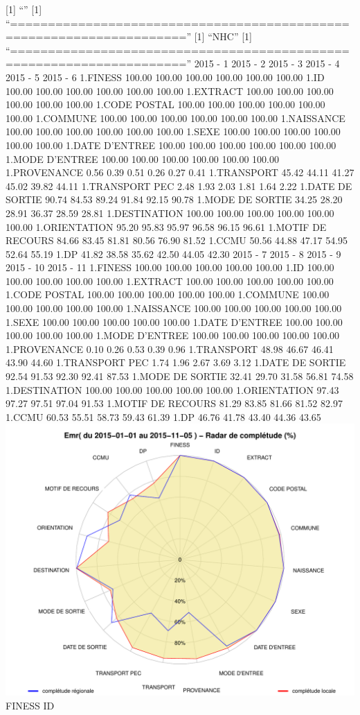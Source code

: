 \documentclass[]{article}
\begin{document}
{[}1{]} ``'' {[}1{]}
``=====================================================================''
{[}1{]} ``NHC'' {[}1{]}
``=====================================================================''
2015 - 1 2015 - 2 2015 - 3 2015 - 4 2015 - 5 2015 - 6 1.FINESS 100.00
100.00 100.00 100.00 100.00 100.00 1.ID 100.00 100.00 100.00 100.00
100.00 100.00 1.EXTRACT 100.00 100.00 100.00 100.00 100.00 100.00 1.CODE
POSTAL 100.00 100.00 100.00 100.00 100.00 100.00 1.COMMUNE 100.00 100.00
100.00 100.00 100.00 100.00 1.NAISSANCE 100.00 100.00 100.00 100.00
100.00 100.00 1.SEXE 100.00 100.00 100.00 100.00 100.00 100.00 1.DATE
D'ENTREE 100.00 100.00 100.00 100.00 100.00 100.00 1.MODE D'ENTREE
100.00 100.00 100.00 100.00 100.00 100.00 1.PROVENANCE 0.56 0.39 0.51
0.26 0.27 0.41 1.TRANSPORT 45.42 44.11 41.27 45.02 39.82 44.11
1.TRANSPORT PEC 2.48 1.93 2.03 1.81 1.64 2.22 1.DATE DE SORTIE 90.74
84.53 89.24 91.84 92.15 90.78 1.MODE DE SORTIE 34.25 28.20 28.91 36.37
28.59 28.81 1.DESTINATION 100.00 100.00 100.00 100.00 100.00 100.00
1.ORIENTATION 95.20 95.83 95.97 96.58 96.15 96.61 1.MOTIF DE RECOURS
84.66 83.45 81.81 80.56 76.90 81.52 1.CCMU 50.56 44.88 47.17 54.95 52.64
55.19 1.DP 41.82 38.58 35.62 42.50 44.05 42.30 2015 - 7 2015 - 8 2015 -
9 2015 - 10 2015 - 11 1.FINESS 100.00 100.00 100.00 100.00 100.00 1.ID
100.00 100.00 100.00 100.00 100.00 1.EXTRACT 100.00 100.00 100.00 100.00
100.00 1.CODE POSTAL 100.00 100.00 100.00 100.00 100.00 1.COMMUNE 100.00
100.00 100.00 100.00 100.00 1.NAISSANCE 100.00 100.00 100.00 100.00
100.00 1.SEXE 100.00 100.00 100.00 100.00 100.00 1.DATE D'ENTREE 100.00
100.00 100.00 100.00 100.00 1.MODE D'ENTREE 100.00 100.00 100.00 100.00
100.00 1.PROVENANCE 0.10 0.26 0.53 0.39 0.96 1.TRANSPORT 48.98 46.67
46.41 43.90 44.60 1.TRANSPORT PEC 1.74 1.96 2.67 3.69 3.12 1.DATE DE
SORTIE 92.54 91.53 92.30 92.41 87.53 1.MODE DE SORTIE 32.41 29.70 31.58
56.81 74.58 1.DESTINATION 100.00 100.00 100.00 100.00 100.00
1.ORIENTATION 97.43 97.27 97.51 97.04 91.53 1.MOTIF DE RECOURS 81.29
83.85 81.66 81.52 82.97 1.CCMU 60.53 55.51 58.73 59.43 61.39 1.DP 46.76
41.78 43.40 44.36 43.65
\includegraphics{completude_files/figure-latex/finess-17.pdf} FINESS ID
\end{document}
